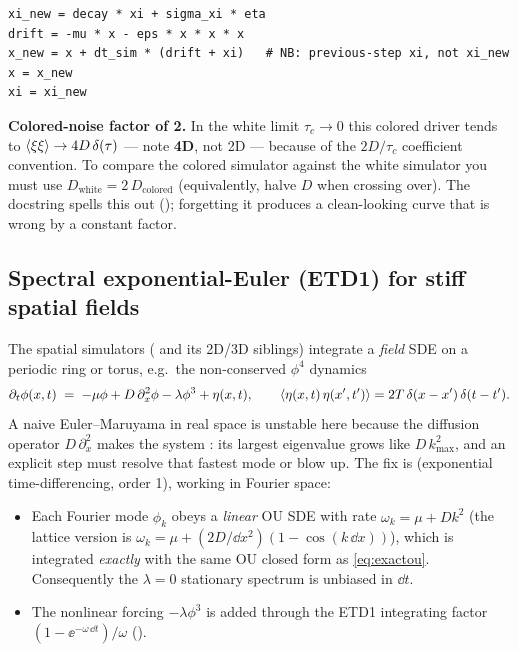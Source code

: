 \begin{lstlisting}
xi_new = decay * xi + sigma_xi * eta
drift = -mu * x - eps * x * x * x
x_new = x + dt_sim * (drift + xi)   # NB: previous-step xi, not xi_new
x = x_new
xi = xi_new
\end{lstlisting}

\begin{gotcha}
\textbf{Colored-noise factor of 2.} In the white limit $\tau_c \to 0$ this colored
driver tends to $\left\langle \xi\xi \right\rangle \to 4D\,\delta(\tau)$ --- note \textbf{4D}, not 2D ---
because of the $2D/\tau_c$ coefficient convention. To compare the colored
simulator against the white simulator you must use $D_{\mathrm{white}} = 2\,
D_{\mathrm{colored}}$ (equivalently, halve $D$ when crossing over). The docstring
spells this out (); forgetting it
produces a clean-looking curve that is wrong by a constant factor.
\end{gotcha}

\subsection{Spectral exponential-Euler (ETD1) for stiff spatial fields}

The spatial simulators ( and its 2D/3D siblings)
integrate a \emph{field} SDE on a periodic ring or torus, e.g.\ the
non-conserved $\phi^{4}$ dynamics
\[
  \partial_t \phi(x,t) \;=\; -\mu\phi + D\,\partial_x^{2}\phi - \lambda\phi^{3} + \eta(x,t),
  \qquad
  \left\langle \eta(x,t)\,\eta(x',t') \right\rangle = 2T\,\delta(x-x')\,\delta(t-t').
\]
A naive Euler--Maruyama in real space is unstable here because the diffusion
operator $D\,\partial_x^{2}$ makes the system : its largest eigenvalue
grows like $D\,k_{\max}^{2}$, and an explicit step must resolve that fastest mode
or blow up. The fix is  (exponential time-differencing, order 1),
working in Fourier space:

\begin{itemize}
  \item Each Fourier mode $\hat\phi_k$ obeys a \emph{linear} OU SDE with rate
        $\omega_k = \mu + D k^{2}$ (the lattice version is $\omega_k = \mu +
        (2D/\dd x^{2})(1 - \cos(k\,\dd x))$), which is integrated \emph{exactly}
        with the same OU closed form as \eqref{eq:exactou}. Consequently the
        $\lambda = 0$ stationary spectrum is unbiased in $\dd t$.
  \item The nonlinear forcing $-\lambda\phi^{3}$ is added through the ETD1
        integrating factor $(1 - \ee^{-\omega\,\dd t})/\omega$
        ().
\end{itemize}

